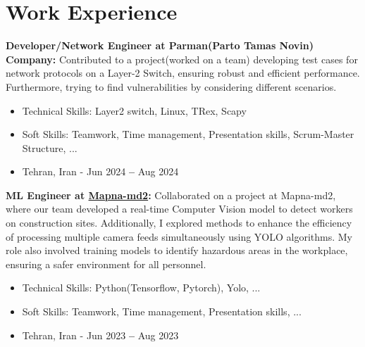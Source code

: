 \documentclass[letterpaper,11pt]{article}
\newcommand{\resumeSubHeadingListStart}{\begin{itemize}[leftmargin=0.15in, label={}]}
\newcommand{\resumeSubHeadingListEnd}{\end{itemize}}
\newcommand{\resumeItemListEnd}{\end{itemize}\vspace{-5pt}}
\begin{document}
	\section{Work Experience}
	\vspace{3pt}
	\resumeSubHeadingListStart
	\small{\item{

            \textbf{Developer/Network Engineer at Parman(Parto Tamas Novin) Company:}{ Contributed to a project(worked on a team) developing test cases for network protocols on a Layer-2 Switch, ensuring robust and efficient performance. Furthermore, trying to find vulnerabilities by considering different scenarios.}

            \begin{itemize}
                \item Technical Skills: Layer2 switch, Linux, TRex, Scapy
                \item Soft Skills: Teamwork, Time management, Presentation skills, Scrum-Master Structure, ...
                \item Tehran, Iran - Jun 2024 \textbf{--} Aug 2024
            \end{itemize}
            
		\textbf{ML Engineer at {\href{https://www.mapnamd2.com/en/}{Mapna-md2}}: }{ Collaborated on a     project at Mapna-md2, where our team developed a real-time Computer Vision model to detect workers on construction sites. Additionally, I explored methods to enhance the efficiency of processing multiple camera feeds simultaneously using YOLO algorithms. My role also involved training models to identify hazardous areas in the workplace, ensuring a safer environment for all personnel.}
            \begin{itemize}
                \item Technical Skills: Python(Tensorflow, Pytorch), Yolo, ...
                \item Soft Skills: Teamwork, Time management, Presentation skills, ...
                \item Tehran, Iran - Jun 2023 \textbf{--} Aug 2023
            \end{itemize}



            

	}}
	\resumeSubHeadingListEnd
	
\end{document}
